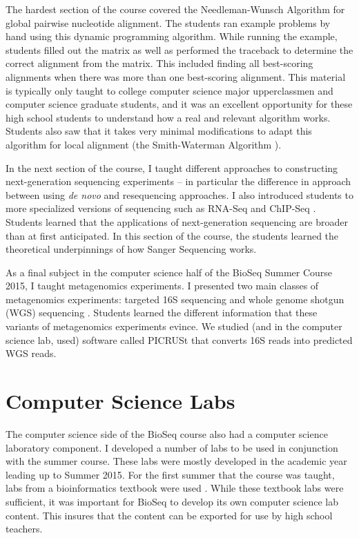 \documentclass{report}
\begin{document}
The hardest section of the course covered the Needleman-Wunsch Algorithm \cite{needleman1970general} for global pairwise nucleotide alignment. The students ran example problems by hand using this dynamic programming algorithm. While running the example, students filled out the matrix as well as performed the traceback to determine the correct alignment from the matrix. This included finding all best-scoring alignments when there was more than one best-scoring alignment. This material is typically only taught to college computer science major upperclassmen and computer science graduate students, and it was an excellent opportunity for these high school students to understand how a real and relevant algorithm works. Students also saw that it takes very minimal modifications to adapt this algorithm for local alignment (the Smith-Waterman Algorithm \cite{smith1981identification}).

In the next section of the course, I taught different approaches to constructing next-generation sequencing experiments -- in particular the difference in approach between using \emph{de novo} and resequencing approaches. I also introduced students to more specialized versions of sequencing such as RNA-Seq \cite{nagalakshmi2008transcriptional} and ChIP-Seq \cite{johnson2007genome}. Students learned that the applications of next-generation sequencing are broader than at first anticipated. In this section of the course, the students learned the theoretical underpinnings of how Sanger Sequencing \cite{sanger1977dna} works.

As a final subject in the computer science half of the BioSeq Summer Course 2015, I taught metagenomics experiments. I presented two main classes of metagenomics experiments: targeted 16S sequencing \cite{qin2010human} and whole genome shotgun (WGS) sequencing \cite{chen2005bioinformatics}. Students learned the different information that these variants of metagenomics experiments evince. We studied (and in the computer science lab, used) software called PICRUSt \cite{langille2013predictive} that converts 16S reads into predicted WGS reads. 

\section{Computer Science Labs}
The computer science side of the BioSeq course also had a computer science laboratory component. I developed a number of labs to be used in conjunction with the summer course. These labs were mostly developed in the academic year leading up to Summer 2015. For the first summer that the course was taught, labs from a bioinformatics textbook were used \cite{st2013exploring}. While these textbook labs were sufficient, it was important for BioSeq to develop its own computer science lab content. This insures that the content can be exported for use by high school teachers.
\end{document}
